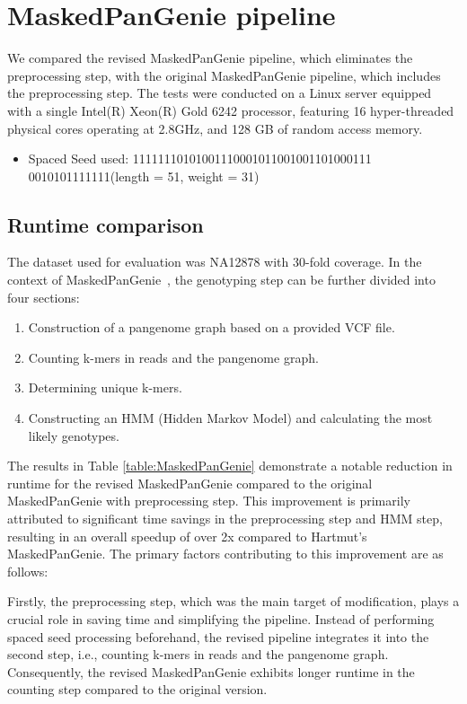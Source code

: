 \documentclass{PHlab-thesis}
\begin{document}
\section{MaskedPanGenie pipeline}
We compared the revised MaskedPanGenie pipeline, which eliminates the preprocessing step, with the original MaskedPanGenie pipeline, which includes the preprocessing step. The tests were conducted on a Linux server equipped with a single Intel(R) Xeon(R) Gold 6242 processor, featuring 16 hyper-threaded physical cores operating at 2.8GHz, and 128 GB of random access memory.
\begin{itemize}
    \item Spaced Seed used: 11111110101001110001011001001101000111\\0010101111111(length = 51, weight = 31)
\end{itemize}
\subsection{Runtime comparison}
The dataset used for evaluation was NA12878 with 30-fold coverage. In the context of MaskedPanGenie~\cite{haimo2023MaskedPanGenie}, the genotyping step can be further divided into four sections:
\begin{enumerate}[label=(\roman*)]
\item Construction of a pangenome graph based on a provided VCF file.
\item Counting k-mers in reads and the pangenome graph.
\item Determining unique k-mers.
\item Constructing an HMM (Hidden Markov Model) and calculating the most likely genotypes.
\end{enumerate}
The results in Table \ref{table:MaskedPanGenie} demonstrate a notable reduction in runtime for the revised MaskedPanGenie compared to the original MaskedPanGenie with preprocessing step. This improvement is primarily attributed to significant time savings in the preprocessing step and HMM step, resulting in an overall speedup of over 2x compared to Hartmut's MaskedPanGenie. The primary factors contributing to this improvement are as follows:

Firstly, the preprocessing step, which was the main target of modification, plays a crucial role in saving time and simplifying the pipeline. Instead of performing spaced seed processing beforehand, the revised pipeline integrates it into the second step, i.e., counting k-mers in reads and the pangenome graph. Consequently, the revised MaskedPanGenie exhibits longer runtime in the counting step compared to the original version.
\end{document}
